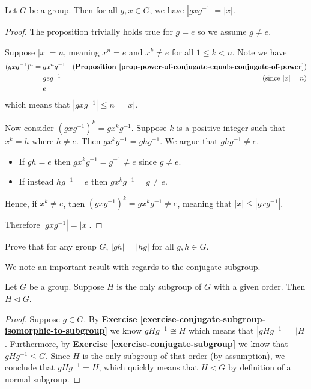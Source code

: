 \begin{proposition}\label{prop-order-of-conjugate-element equals-order-of-element}
    Let $G$ be a group. Then for all $g, x \in G$, we have $|gxg^{-1}| = |x|$.
\end{proposition}
\begin{proof}
    The proposition trivially holds true for $g = e$ so we assume $g \neq e$.

    Suppose $|x| = n$, meaning $x^n = e$ and $x^k \neq e$ for all $1 \leq k < n$. Note we have
    \begin{align*}
        (gxg^{-1})^n  &= gx^ng^{-1} & \text{(\textbf{Proposition \ref{prop-power-of-conjugate-equals-conjugate-of-power}})}\\
        &= geg^{-1} & \text{(since } |x| = n)\\
        &= e
    \end{align*}
    which means that $|gxg^{-1}| \leq n = |x|$.

    Now consider $(gxg^{-1})^k = gx^kg^{-1}$. Suppose $k$ is a positive integer such that $x^k = h$ where $h \neq e$. Then $gx^kg^{-1} = ghg^{-1}$. We argue that $ghg^{-1} \neq e$.
    \begin{itemize}
        \item If $gh = e$ then $gx^kg^{-1} = g^{-1} \neq e$ since $g \neq e$.
        \item If instead $hg^{-1} = e$ then $gx^kg^{-1} = g \neq e$.
    \end{itemize}
    Hence, if $x^k \neq e$, then $(gxg^{-1})^k = gx^kg^{-1} \neq e$, meaning that $|x| \leq |gxg^{-1}|$.

    Therefore $|gxg^{-1}| = |x|$.
\end{proof}

\begin{exercise}
    Prove that for any group $G$, $|gh| = |hg|$ for all $g, h \in G$.
\end{exercise}

We note an important result with regards to the conjugate subgroup.
\begin{theorem}\label{thrm-unique-subgroup-of-given-order-is-normal}
    Let $G$ be a group. Suppose $H$ is the only subgroup of $G$ with a given order. Then $H \lhd G$.
\end{theorem}
\begin{proof}
    Suppose $g \in G$. By \textbf{Exercise \ref{exercise-conjugate-subgroup-isomorphic-to-subgroup}} we know $gHg^{-1} \cong H$ which means that $|gHg^{-1}| = |H|$. Furthermore, by \textbf{Exercise \ref{exercise-conjugate-subgroup}} we know that $gHg^{-1} \leq G$. Since $H$ is the only subgroup of that order (by assumption), we conclude that $gHg^{-1} = H$, which quickly means that $H \lhd G$ by definition of a normal subgroup.
\end{proof}

